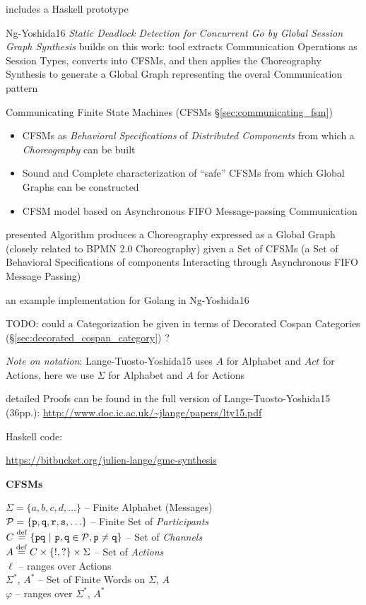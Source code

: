 includes a Haskell prototype

Ng-Yoshida16 \emph{Static Deadlock Detection for Concurrent Go by
  Global Session Graph Synthesis} builds on this work: tool extracts
Communication Operations as Session Types, converts into CFSMs, and
then applies the Choreography Synthesis to generate a Global Graph
representing the overal Communication pattern

\fist Communicating Finite State Machines (CFSMs
\S\ref{sec:communicating_fsm})

\begin{itemize}
\item CFSMs as \emph{Behavioral Specifications} of \emph{Distributed
  Components} from which a \emph{Choreography} can be built
\item Sound and Complete characterization of ``safe'' CFSMs from which
  Global Graphs can be constructed
\item CFSM model based on Asynchronous FIFO Message-passing
  Communication
\end{itemize}

presented Algorithm produces a Choreography expressed as a Global Graph
(closely related to BPMN 2.0 Choreography) given a Set of CFSMs (a Set
of Behavioral Specifications of components Interacting through
Asynchronous FIFO Message Passing)

\fist an example implementation for Golang in Ng-Yoshida16

TODO: could a Categorization be given in terms of Decorated Cospan
Categories (\S\ref{sec:decorated_cospan_category}) ?

\asterism

\emph{Note on notation}: Lange-Tuosto-Yoshida15 uses $A$ for
Alphabet and $Act$ for Actions, here we use $\Sigma$ for Alphabet and
$A$ for Actions

detailed Proofs can be found in the full version of
Lange-Tuosto-Yoshida15 (36pp.):
\url{http://www.doc.ic.ac.uk/~jlange/papers/lty15.pdf}

Haskell code:

\url{https://bitbucket.org/julien-lange/gmc-synthesis}


\textbf{CFSMs}

$\Sigma = \{ a,b,c,d,\ldots \}$ -- Finite Alphabet (Messages) \\
$\mathcal{P} = \{ \mathtt{p, q, r, s},\ldots\}$
-- Finite Set of \emph{Participants} \\
$C \stackrel{\mathrm{def}}= \{ \mathtt{pq}
  \ |\ \mathtt{p,q} \in \mathcal{P}, \mathtt{p \neq q} \}$
-- Set of \emph{Channels} \\
$A \stackrel{\mathrm{def}}= C \times \{!,?\} \times \Sigma$ -- Set of \emph{Actions} \\
$\ell$ -- ranges over Actions \\
$\Sigma^*$, $A^*$ -- Set of Finite Words on $\Sigma$, $A$ \\
$\varphi$ -- ranges over $\Sigma^*$, $A^*$ \\

